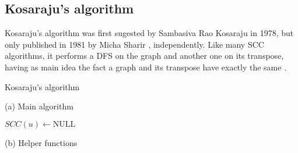 \subsection{Kosaraju's algorithm} \label{algorithm-scc-kosaraju}
Kosaraju's algorithm was first sugested by Sambasiva Rao Kosaraju in 1978, but only published in 1981 by Micha Sharir \cite{sharir81}, independently. Like many \acrshort*{SCC} algorithms, it performs a \acrshort{DFS} on the graph and another one on its transpose, having as main idea the fact a graph and its transpose have exactly the same .
\begin{algorithm}[ht]
    \caption{Kosaraju's algorithm}
    \label{alg-kosaraju}
    \begin{minipage}[t]{0.49\textwidth}
        (a) Main algorithm
        \begin{algorithmic}[1]
             {$SCC(u) \gets \text{NULL}$}
            \EndFor
             {}
            \EndFor
             \label{alg:kosaraju-start-cycle}
                \State {}
            \EndWhile
            \State {}
            \EndFunction
        \end{algorithmic}
    \end{minipage}
    \begin{minipage}[t]{0.49\textwidth}
        (b) Helper functions
        \begin{algorithmic}[1]
                 {\Return{}}
                \EndIf
                 {}
                \EndFor
            \EndFunction

            
                 {\Return{}}
                \EndIf
                 {}
                \EndFor
            \EndFunction
        \end{algorithmic}
    \end{minipage}
\end{algorithm}
\vspace{-1em}
